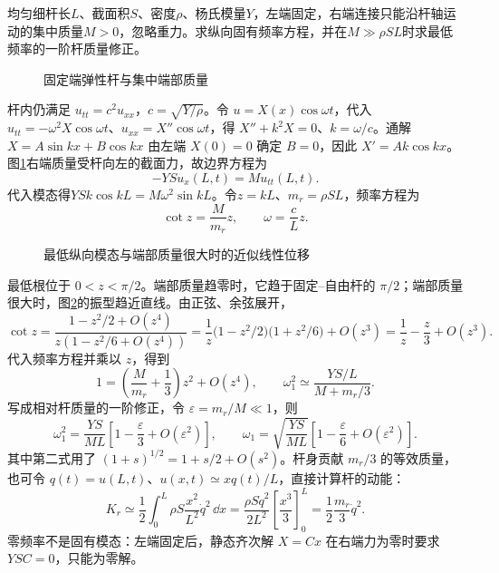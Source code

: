 \begin{example}[端部质量改变弹性杆的频率]\label{ex:sup7-rodmass}
均匀细杆长$L$、截面积$S$、密度$\rho$、杨氏模量$Y$，左端固定，右端连接只能沿杆轴运动的集中质量$M>0$，忽略重力。求纵向固有频率方程，并在$M\gg\rho SL$时求最低频率的一阶杆质量修正。
\begin{figure}[H]\centering
{}
\caption{固定端弹性杆与集中端部质量}\label{fig:sup7-rodmass-q}
\end{figure}
\end{example}
\begin{solution}
杆内仍满足 $u_{tt}=c^2u_{xx}$，$c=\sqrt{Y/\rho}$。令 $u=X(x)\cos\omega t$，代入 $u_{tt}=-\omega^2X\cos\omega t$、$u_{xx}=X''\cos\omega t$，得 $X''+k^2X=0$、$k=\omega/c$。通解 $X=A\sin kx+B\cos kx$ 由左端 $X(0)=0$ 确定 $B=0$，因此 $X'=Ak\cos kx$。图\ref{fig:sup7-rodmass-q}右端质量受杆向左的截面力，故边界方程为
\[
 -YSu_x(L,t)=Mu_{tt}(L,t).
\]
代入模态得$YSk\cos kL=M\omega^2\sin kL$。令$z=kL$、$m_r=\rho SL$，频率方程为
\[
 \boxed{\cot z=\frac{M}{m_r}z},\qquad \omega=\frac cLz.
\]
\begin{figure}[H]\centering
{}
\caption{最低纵向模态与端部质量很大时的近似线性位移}\label{fig:sup7-rodmass-s}
\end{figure}
最低根位于 $0<z<\pi/2$。端部质量趋零时，它趋于固定--自由杆的 $\pi/2$；端部质量很大时，图\ref{fig:sup7-rodmass-s}的振型趋近直线。由正弦、余弦展开，
\[
\cot z=\frac{1-z^2/2+O(z^4)}{z(1-z^2/6+O(z^4))}
=\frac1z\bigl(1-z^2/2\bigr)\bigl(1+z^2/6\bigr)+O(z^3)
=\frac1z-\frac z3+O(z^3).
\]
代入频率方程并乘以 $z$，得到
\[
 1=\left(\frac M{m_r}+\frac13\right)z^2+O(z^4),
 \qquad \omega_1^2\simeq\frac{YS/L}{M+m_r/3}.
\]
写成相对杆质量的一阶修正，令 $\varepsilon=m_r/M\ll1$，则
\[
\omega_1^2=\frac{YS}{ML}\left[1-\frac\varepsilon3+O(\varepsilon^2)\right],\qquad
\omega_1=\sqrt{\frac{YS}{ML}}\left[1-\frac\varepsilon6+O(\varepsilon^2)\right].
\]
其中第二式用了 $(1+s)^{1/2}=1+s/2+O(s^2)$。杆身贡献 $m_r/3$ 的等效质量，也可令 $q(t)=u(L,t)$、$u(x,t)\simeq xq(t)/L$，直接计算杆的动能：
\[
K_r\simeq\frac12\int_0^L\rho S\frac{x^2}{L^2}\dot q^2\,\dd x
=\frac{\rho S\dot q^2}{2L^2}\left[\frac{x^3}{3}\right]_0^L
=\frac12\frac{m_r}{3}\dot q^2.
\]
零频率不是固有模态：左端固定后，静态齐次解 $X=Cx$ 在右端力为零时要求 $YSC=0$，只能为零解。
\end{solution}



